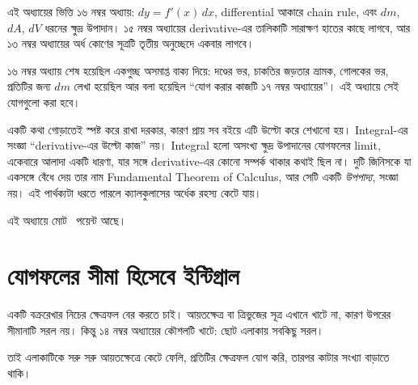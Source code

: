 \documentclass[11pt]{article}
\begin{document}

\noindent
এই অধ্যায়ের ভিত্তি ১৬ নম্বর অধ্যায়: $dy = f'(x)\,dx$, differential
আকারে chain rule, এবং $dm$, $dA$, $dV$ ধরনের ক্ষুদ্র উপাদান। ১৫ নম্বর
অধ্যায়ের derivative-এর তালিকাটি সারাক্ষণ হাতের কাছে লাগবে, আর ১৩ নম্বর
অধ্যায়ের অর্ধ কোণের সূত্রটি তৃতীয় অনুচ্ছেদে একবার লাগবে।

১৬ নম্বর অধ্যায় শেষ হয়েছিল একগুচ্ছ অসমাপ্ত বাক্য দিয়ে: দণ্ডের ভর, চাকতির
জড়তার ভ্রামক, গোলকের ভর, প্রতিটির জন্য $dm$ লেখা হয়েছিল আর বলা হয়েছিল ``যোগ
করার কাজটি ১৭ নম্বর অধ্যায়ের''। এই অধ্যায়ে সেই যোগগুলো করা হবে।

একটি কথা গোড়াতেই স্পষ্ট করে রাখা দরকার, কারণ প্রায় সব বইয়ে এটি উল্টো করে
শেখানো হয়। Integral-এর সংজ্ঞা ``derivative-এর উল্টো কাজ'' নয়। Integral হলো
অসংখ্য ক্ষুদ্র উপাদানের যোগফলের limit, একেবারে আলাদা একটি ধারণা, যার সঙ্গে
derivative-এর কোনো সম্পর্ক থাকার কথাই ছিল না। দুটি জিনিসকে যা একসঙ্গে বেঁধে
দেয় তার নাম Fundamental Theorem of Calculus, আর সেটি একটি \emph{উপপাদ্য},
সংজ্ঞা নয়। এই পার্থক্যটা ধরতে পারলে ক্যালকুলাসের অর্ধেক রহস্য কেটে যায়।

এই অধ্যায়ে মোট \totalpoints\ পয়েন্ট আছে।

\section{যোগফলের সীমা হিসেবে ইন্টিগ্রাল}

একটি বক্ররেখার নিচের ক্ষেত্রফল বের করতে চাই। আয়তক্ষেত্র বা ত্রিভুজের সূত্র
এখানে খাটে না, কারণ উপরের সীমানাটি সরল নয়। কিন্তু ১৪ নম্বর অধ্যায়ের
কৌশলটি খাটে: ছোট এলাকায় সবকিছু সরল।

তাই এলাকাটিকে সরু সরু আয়তক্ষেত্রে কেটে ফেলি, প্রতিটির ক্ষেত্রফল যোগ করি, তারপর
কাটার সংখ্যা বাড়াতে থাকি।
\end{document}
